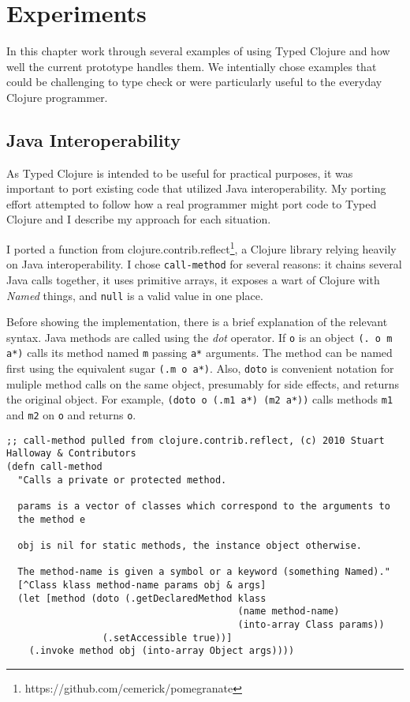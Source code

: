 \chapter{Experiments}

In this chapter work through several examples of using Typed Clojure and
how well the current prototype handles them. 
We intentially chose examples that could be challenging to type check
or were particularly useful to the everyday Clojure programmer.

\section{Java Interoperability}
\label{sec:experimentinterop}

As Typed Clojure is intended to be useful for practical purposes, it was important
to port existing code that utilized Java interoperability.
My porting effort attempted to follow how a real programmer might port code to Typed Clojure
and I describe my approach for each situation.

I ported a function from clojure.contrib.reflect\footnote{https://github.com/cemerick/pomegranate}, 
a Clojure library relying heavily on Java interoperability.
I chose \lstinline|call-method| for several reasons: it chains several Java calls together,
it uses primitive arrays, it exposes a wart of Clojure with \emph{Named} things,
and \lstinline|null| is a valid value in one place.

Before showing the implementation, there is a brief explanation of the relevant syntax.
Java methods are called using the \emph{dot} operator. If \lstinline|o| is an object \lstinline|(. o m a*)|
calls its method named \lstinline|m| passing \lstinline|a*| arguments. The method can be named first
using the equivalent sugar \lstinline|(.m o a*)|. Also, \lstinline|doto| is convenient 
notation for muliple method calls on the same object, presumably for side effects, and returns the original
object. For example, \lstinline|(doto o (.m1 a*) (m2 a*))| calls methods \lstinline|m1| and \lstinline|m2|
on \lstinline|o| and returns \lstinline|o|.

\begin{lstlisting}[caption=call-method, label=lst:callmethod]
;; call-method pulled from clojure.contrib.reflect, (c) 2010 Stuart Halloway & Contributors
(defn call-method
  "Calls a private or protected method.

  params is a vector of classes which correspond to the arguments to
  the method e

  obj is nil for static methods, the instance object otherwise.

  The method-name is given a symbol or a keyword (something Named)."
  [^Class klass method-name params obj & args]
  (let [method (doto (.getDeclaredMethod klass 
                                         (name method-name)
                                         (into-array Class params))
                 (.setAccessible true))]
    (.invoke method obj (into-array Object args))))
\end{lstlisting}


